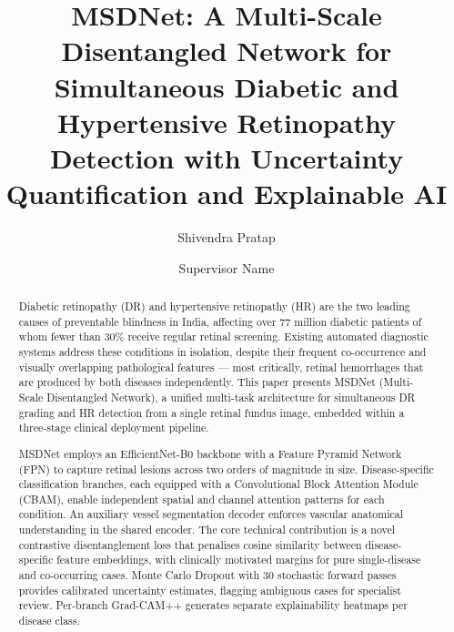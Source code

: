 \documentclass[review,12pt]{elsarticle}
\begin{document}
\begin{frontmatter}

\title{MSDNet: A Multi-Scale Disentangled Network for Simultaneous
Diabetic and Hypertensive Retinopathy Detection with Uncertainty
Quantification and Explainable AI}

\author[lpu]{Shivendra Pratap}
\author[lpu]{Supervisor Name}



\begin{abstract}
Diabetic retinopathy (DR) and hypertensive retinopathy (HR) are the two
leading causes of preventable blindness in India, affecting over 77 million
diabetic patients of whom fewer than 30\% receive regular retinal screening.
Existing automated diagnostic systems address these conditions in isolation,
despite their frequent co-occurrence and visually overlapping pathological
features — most critically, retinal hemorrhages that are produced by both
diseases independently. This paper presents MSDNet (Multi-Scale Disentangled
Network), a unified multi-task architecture for simultaneous DR grading
and HR detection from a single retinal fundus image, embedded within a
three-stage clinical deployment pipeline.

MSDNet employs an EfficientNet-B0 backbone with a Feature Pyramid Network
(FPN) to capture retinal lesions across two orders of magnitude in size.
Disease-specific classification branches, each equipped with a Convolutional
Block Attention Module (CBAM), enable independent spatial and channel
attention patterns for each condition. An auxiliary vessel segmentation
decoder enforces vascular anatomical understanding in the shared encoder.
The core technical contribution is a novel contrastive disentanglement loss
that penalises cosine similarity between disease-specific feature embeddings,
with clinically motivated margins for pure single-disease and co-occurring
cases. Monte Carlo Dropout with 30 stochastic forward passes provides
calibrated uncertainty estimates, flagging ambiguous cases for specialist
review. Per-branch Grad-CAM++ generates separate explainability heatmaps
per disease class.


\end{abstract}
\end{frontmatter}
\end{document}
